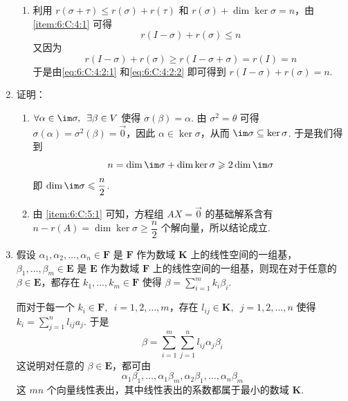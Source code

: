 \begin{enumerate}
\begin{enumerate}
              \item 利用 $ r(\sigma + \tau) \leqslant r(\sigma) + r(\tau) $ 和 $ r(\sigma) + \dim \ker \sigma = n $，由 \ref*{item:6:C:4:1} 可得
                    \begin{equation} \label{eq:6:C:4:2:1}
                        r(I - \sigma) + r(\sigma) \leqslant n
                    \end{equation}
                    又因为
                    \begin{equation} \label{eq:6:C:4:2:2}
                        r(I - \sigma) + r(\sigma) \geqslant r(I - \sigma + \sigma) = r(I) = n
                    \end{equation}
                    于是由\autoref{eq:6:C:4:2:1} 和\autoref{eq:6:C:4:2:2} 即可得到 $ r(I - \sigma) + r(\sigma) = n $.
          \end{enumerate}

    \item 证明：\begin{enumerate}
              \item \label{item:6:C:5:1}
                    $ \forall \alpha \in \im \sigma,\enspace \exists \beta \in V $ 使得 $ \sigma(\beta) = \alpha $. 由 $ \sigma^2 = \theta $ 可得 $ \sigma(\alpha) = \sigma^2(\beta) = \vec{0} $，因此 $ \alpha \in \ker \sigma $，从而 $ \im \sigma \subseteq \ker \sigma $. 于是我们得到
                    \[ n = \dim \im \sigma + \dim \ker \sigma \geqslant 2 \dim \im \sigma \]
                    即 $ \dim \im \sigma \leqslant \dfrac{n}{2} $.

              \item 由 \ref*{item:6:C:5:1} 可知，方程组 $ AX = \vec{0} $ 的基础解系含有 $ n - r(A) = \dim \ker \sigma \geqslant \dfrac{n}{2} $ 个解向量，所以结论成立.
          \end{enumerate}

    \item 假设 $ \alpha_1, \alpha_2, \ldots, \alpha_n \in \mathbf{F} $ 是 $ \mathbf{F} $ 作为数域 $ \mathbf{K} $ 上的线性空间的一组基，$ \beta_1, \ldots, \beta_m \in \mathbf{E} $ 是 $ \mathbf{E} $ 作为数域 $ \mathbf{F} $ 上的线性空间的一组基，则现在对于任意的 $ \beta \in \mathbf{E} $，都存在 $ k_1, \ldots, k_m \in \mathbf{F} $ 使得 $ \beta = \displaystyle\sum_{i = 1}^{m} k_i \beta_i $.

          而对于每一个 $ k_i \in \mathbf{F},\enspace i = 1, 2, \ldots, m $，存在 $ l_{ij} \in \mathbf{K},\enspace j = 1, 2, \ldots, n $ 使得 $ k_i = \displaystyle\sum_{j = 1}^{n} l_{ij} a_j $. 于是
          \[ \beta = \sum_{i = 1}^{m} \sum_{j = 1}^{n} l_{ij} \alpha_j \beta_i \]
          这说明对任意的 $ \beta \in \mathbf{E} $，都可由
          \[ \alpha_1 \beta_1, \ldots, \alpha_1 \beta_m, \alpha_2 \beta_1, \ldots, \alpha_n \beta_m \]
          这 $ mn $ 个向量线性表出，其中线性表出的系数都属于最小的数域 $ \mathbf{K} $.


\end{enumerate}
